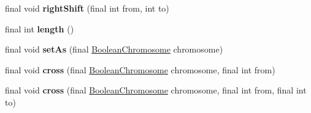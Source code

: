 \begin{DoxyCompactItemize}
\item 
\hypertarget{classjenes_1_1chromosome_1_1_boolean_chromosome_a866689aeafc1b4a5e83c14a1605bc7ce}{final void {\bfseries right\-Shift} (final int from, int to)}\label{classjenes_1_1chromosome_1_1_boolean_chromosome_a866689aeafc1b4a5e83c14a1605bc7ce}

\item 
\hypertarget{classjenes_1_1chromosome_1_1_boolean_chromosome_a4665770a8e625c26f3704b41fecb10f8}{final int {\bfseries length} ()}\label{classjenes_1_1chromosome_1_1_boolean_chromosome_a4665770a8e625c26f3704b41fecb10f8}

\item 
\hypertarget{classjenes_1_1chromosome_1_1_boolean_chromosome_a16d9851ba21583010d003378a7d59d19}{final void {\bfseries set\-As} (final \hyperlink{classjenes_1_1chromosome_1_1_boolean_chromosome}{Boolean\-Chromosome} chromosome)}\label{classjenes_1_1chromosome_1_1_boolean_chromosome_a16d9851ba21583010d003378a7d59d19}

\item 
\hypertarget{classjenes_1_1chromosome_1_1_boolean_chromosome_aa1c3c421b6e8e6db44fb7cce7443e669}{final void {\bfseries cross} (final \hyperlink{classjenes_1_1chromosome_1_1_boolean_chromosome}{Boolean\-Chromosome} chromosome, final int from)}\label{classjenes_1_1chromosome_1_1_boolean_chromosome_aa1c3c421b6e8e6db44fb7cce7443e669}

\item 
\hypertarget{classjenes_1_1chromosome_1_1_boolean_chromosome_af31ce0ed4f82fccd837cfde93bc4ee61}{final void {\bfseries cross} (final \hyperlink{classjenes_1_1chromosome_1_1_boolean_chromosome}{Boolean\-Chromosome} chromosome, final int from, final int to)}\label{classjenes_1_1chromosome_1_1_boolean_chromosome_af31ce0ed4f82fccd837cfde93bc4ee61}


\end{DoxyCompactItemize}
